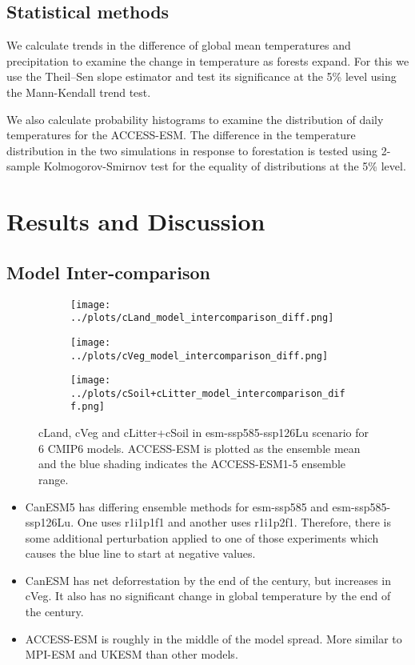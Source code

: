 \documentclass[]{article}
\begin{document}
\subsection{Statistical methods}

We calculate trends in the difference of global mean temperatures and precipitation to examine the change in temperature as forests expand.
For this we use the Theil–Sen slope estimator and test its significance at the 5\% level using the Mann-Kendall trend test.

We also calculate probability histograms to examine the distribution of daily temperatures for the ACCESS-ESM.
The difference in the temperature distribution in the two simulations in response to forestation is tested using 2-sample Kolmogorov-Smirnov test for the equality of distributions at the 5\% level.

\section{Results and Discussion}

\subsection{Model Inter-comparison}

\begin{figure}[H]
    \centering
    \begin{subfigure}[b]{0.45\linewidth}
        \texttt{[image: ../plots/cLand\_model\_intercomparison\_diff.png]}
    \end{subfigure}
    \begin{subfigure}[b]{0.45\linewidth}
        \texttt{[image: ../plots/cVeg\_model\_intercomparison\_diff.png]}
    \end{subfigure}
    \begin{subfigure}[b]{0.45\linewidth}
        \texttt{[image: ../plots/cSoil+cLitter\_model\_intercomparison\_diff.png]}
    \end{subfigure}
    \caption{cLand, cVeg and cLitter+cSoil in esm-ssp585-ssp126Lu scenario for 6 CMIP6 models. ACCESS-ESM is plotted as the ensemble mean and the blue shading indicates the ACCESS-ESM1-5 ensemble range.}
    \label{fig:models_cpools}
\end{figure}

\begin{itemize}
    \item CanESM5 has differing ensemble methods for esm-ssp585 and esm-ssp585-ssp126Lu. One uses r1i1p1f1 and another uses r1i1p2f1. Therefore, there is some additional perturbation applied to one of those experiments which causes the blue line to start at negative values.
    \item CanESM has net deforrestation by the end of the century, but increases in cVeg. It also has no significant change in global temperature by the end of the century.
    \item ACCESS-ESM is roughly in the middle of the model spread. More similar to MPI-ESM and UKESM than other models.
\end{itemize}
\end{document}
